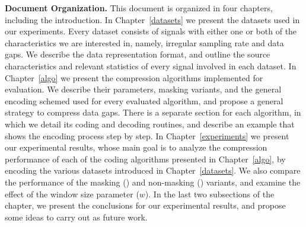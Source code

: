 \textbf{Document Organization.} This document is organized in four chapters, including the introduction. In Chapter~\ref{datasets} we present the datasets used in our experiments. Every dataset consists of signals with either one or both of the characteristics we are interested in, namely, irregular sampling rate and data gaps. We describe the data representation format, and outline the source characteristics and relevant statistics of every signal involved in each dataset. In Chapter~\ref{algo} we present the compression algorithms implemented for evaluation. We describe their parameters, masking variants, and the general encoding schemed used for every evaluated algorithm, and propose a general strategy to compress data gaps. There is a separate section for each algorithm, in which we detail its coding and decoding routines, and describe an example that shows the encoding process step by step. In Chapter~\ref{experiments} we present our experimental results, whose main goal is to analyze the compression performance of each of the coding algorithms presented in Chapter~\ref{algo}, by encoding the various datasets introduced in Chapter~\ref{datasets}. We also compare the performance of the masking (\maskalgo) and non-masking (\NOmaskalgo) variants, and examine the effect of the window size parameter ($w$). In the last two subsections of the chapter, we present the conclusions for our experimental results, and propose some ideas to carry out as future work.


